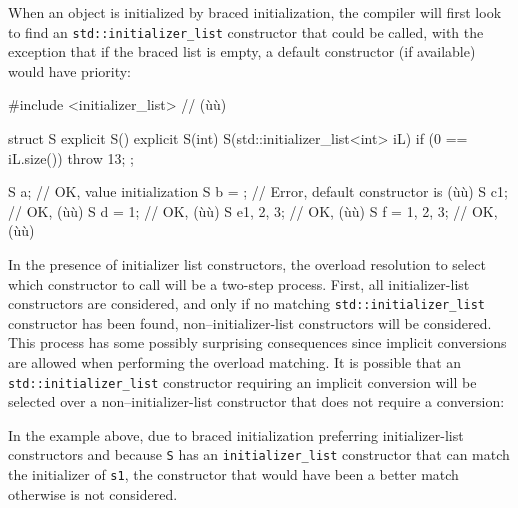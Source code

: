 When an object is initialized by braced initialization, the compiler
will first look to find an \lstinline!std::initializer_list! constructor
that could be called, with the exception that if the braced list is
empty, a default constructor (if available) would have priority:

\begin{emcppslisting}
#include <initializer_list>  // (ù{}ù)

struct S {
  explicit S() {}
  explicit S(int) {}
  S(std::initializer_list<int> iL) { if (0 == iL.size()) {throw 13;} }
};

S a{};            // OK, value initialization
S b = {};         // Error, default constructor is (ù{}ù)
S c{1};           // OK, (ù{}ù)
S d = {1};        // OK, (ù{}ù)
S e{1, 2, 3};     // OK, (ù{}ù)
S f = {1, 2, 3};  // OK, (ù{}ù)
\end{emcppslisting}
    

\noindent In the presence of initializer list constructors, the overload
resolution to select which constructor to call will be a two-step
process. First, all initializer-list constructors are considered, and
only if no matching \lstinline!std::initializer_list! constructor has been
found, non--initializer-list constructors will be considered. This
process has some possibly surprising consequences since implicit
conversions are allowed when performing the overload matching. It is
possible that an \lstinline!std::initializer_list! constructor requiring
an implicit conversion will be selected over a non--initializer-list
constructor that does not require a conversion:

    

\noindent In the example above, due to braced initialization preferring
initializer-list constructors and because \lstinline!S! has an
\lstinline!initializer_list! constructor that can match the initializer of
\lstinline!s1!, the constructor that would have been a better match
otherwise is not considered.

